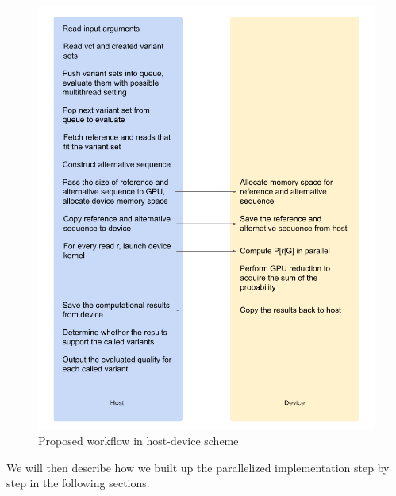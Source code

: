 \documentclass{PHlab-thesis}
\begin{document}
\begin{figure}
	\centering
	\includegraphics[scale=0.5]{figures/proposed.png}
	\caption{Proposed workflow in host-device scheme}
	\label{fig:prop} %
\end{figure}

We will then describe how we built up the parallelized implementation step by step in the following sections.
\end{document}
